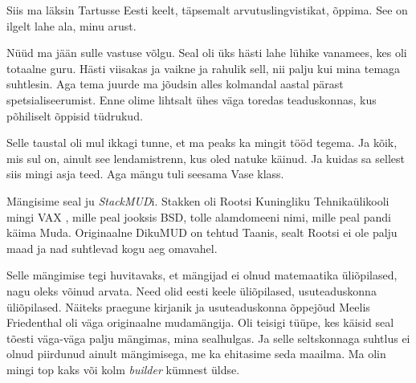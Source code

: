 Siis ma läksin Tartusse Eesti keelt, täpsemalt 
arvutuslingvistikat, õppima. See on ilgelt lahe ala, minu arust.


Nüüd ma jään sulle vastuse võlgu. Seal oli üks hästi lahe lühike vanamees, kes 
oli  totaalne guru. Hästi viisakas ja vaikne ja rahulik sell, nii palju kui 
mina temaga suhtlesin. Aga tema juurde ma jõudsin alles kolmandal aastal pärast 
spetsialiseerumist. Enne olime lihtsalt ühes väga toredas teaduskonnas, kus 
põhiliselt õppisid tüdrukud.

Selle taustal oli mul ikkagi tunne, et ma peaks ka mingit tööd tegema. Ja kõik, 
mis sul on, ainult see lendamistrenn, kus oled natuke käinud. Ja kuidas sa 
sellest siis mingi asja teed. Aga mängu tuli seesama Vase klass.

Mängisime seal ju \emph{StackMUD}i. Stakken oli Rootsi 
Kuningliku Tehnikaülikooli mingi 
VAX , mille peal 
jooksis BSD, tolle alamdomeeni nimi, mille peal pandi käima Muda. 
Originaalne DikuMUD on tehtud Taanis, sealt Rootsi ei ole palju maad ja nad 
suhtlevad kogu aeg omavahel.

Selle mängimise tegi huvitavaks, et mängijad ei olnud  matemaatika üliõpilased, 
nagu oleks võinud arvata. Need olid eesti keele üliõpilased, usuteaduskonna 
üliõpilased. Näiteks praegune kirjanik ja usuteaduskonna õppejõud Meelis 
Friedenthal oli väga originaalne mudamängija. 
Oli teisigi tüüpe, kes  käisid seal tõesti väga-väga palju mängimas, mina 
sealhulgas. Ja selle seltskonnaga suhtlus ei olnud piirdunud ainult 
mängimisega, me ka ehitasime seda maailma. Ma olin mingi top kaks või kolm 
\emph{builder} kümnest üldse.


